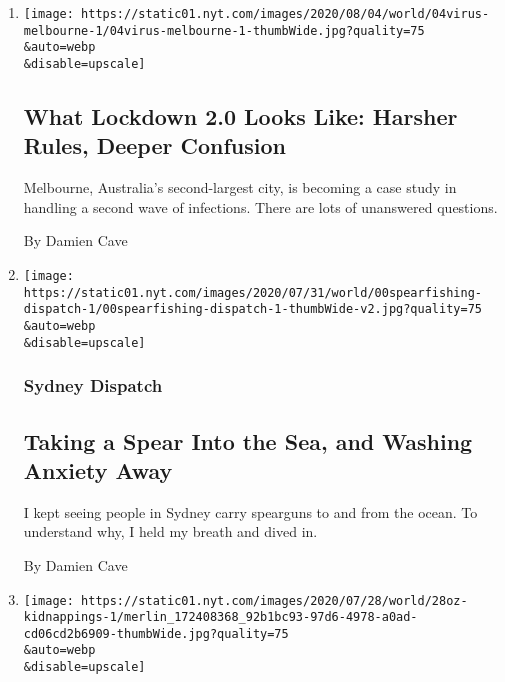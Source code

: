 \begin{enumerate}
\def\labelenumi{\arabic{enumi}.}
\item
  \href{/2020/08/04/world/australia/coronavirus-melbourne-lockdown.html}{}

  \texttt{[image: https://static01.nyt.com/images/2020/08/04/world/04virus-melbourne-1/04virus-melbourne-1-thumbWide.jpg?quality=75\\\&auto=webp\\\&disable=upscale]}

  \hypertarget{what-lockdown-20-looks-like-harsher-rules-deeper-confusion}{%
  \subsection{What Lockdown 2.0 Looks Like: Harsher Rules, Deeper
  Confusion}\label{what-lockdown-20-looks-like-harsher-rules-deeper-confusion}}

  Melbourne, Australia's second-largest city, is becoming a case study
  in handling a second wave of infections. There are lots of unanswered
  questions.

  By Damien Cave
\item
  \href{/2020/08/03/world/australia/spearfishing-sydney-coronavirus.html}{}

  \texttt{[image: https://static01.nyt.com/images/2020/07/31/world/00spearfishing-dispatch-1/00spearfishing-dispatch-1-thumbWide-v2.jpg?quality=75\\\&auto=webp\\\&disable=upscale]}

  \hypertarget{sydney-dispatch}{%
  \subsubsection{Sydney Dispatch}\label{sydney-dispatch}}

  \hypertarget{taking-a-spear-into-the-sea-and-washing-anxiety-away}{%
  \subsection{Taking a Spear Into the Sea, and Washing Anxiety
  Away}\label{taking-a-spear-into-the-sea-and-washing-anxiety-away}}

  I kept seeing people in Sydney carry spearguns to and from the ocean.
  To understand why, I held my breath and dived in.

  By Damien Cave
\item
  \href{/2020/07/28/world/australia/chinese-students-virtual-kidnapping.html}{}

  \texttt{[image: https://static01.nyt.com/images/2020/07/28/world/28oz-kidnappings-1/merlin\_172408368\_92b1bc93-97d6-4978-a0ad-cd06cd2b6909-thumbWide.jpg?quality=75\\\&auto=webp\\\&disable=upscale]}


\end{enumerate}
